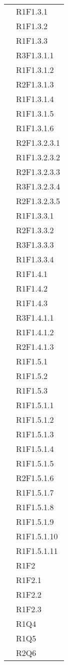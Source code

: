 \begin{longtable}{|>{\centering}m{5cm}|m{5cm}<{\centering}|}
&{R1F1.3.1}\\
&{R1F1.3.2}\\
&{R1F1.3.3}\\
&{R3F1.3.1.1}\\
&{R1F1.3.1.2}\\
&{R2F1.3.1.3}\\
&{R1F1.3.1.4}\\
&{R1F1.3.1.5}\\
&{R1F1.3.1.6}\\
&{R2F1.3.2.3.1}\\
&{R1F1.3.2.3.2}\\
&{R2F1.3.2.3.3}\\
&{R3F1.3.2.3.4}\\
&{R2F1.3.2.3.5}\\
&{R1F1.3.3.1}\\
&{R2F1.3.3.2}\\
&{R3F1.3.3.3}\\
&{R1F1.3.3.4}\\

&{R1F1.4.1}\\
&{R1F1.4.2}\\
&{R1F1.4.3}\\
&{R3F1.4.1.1}\\
&{R1F1.4.1.2}\\
&{R2F1.4.1.3}\\

&{R1F1.5.1}\\
&{R1F1.5.2}\\
&{R1F1.5.3}\\
&{R1F1.5.1.1}\\
&{R1F1.5.1.2}\\
&{R1F1.5.1.3}\\
&{R1F1.5.1.4}\\
&{R1F1.5.1.5}\\
&{R2F1.5.1.6}\\
&{R1F1.5.1.7}\\
&{R1F1.5.1.8}\\
&{R1F1.5.1.9}\\
&{R1F1.5.1.10}\\
&{R1F1.5.1.11}\\

&{R1F2}\\
&{R1F2.1}\\
&{R1F2.2}\\
&{R1F2.3}\\

&{R1Q4}\\
&{R1Q5}\\
&{R2Q6}\\ 


\end{longtable}
